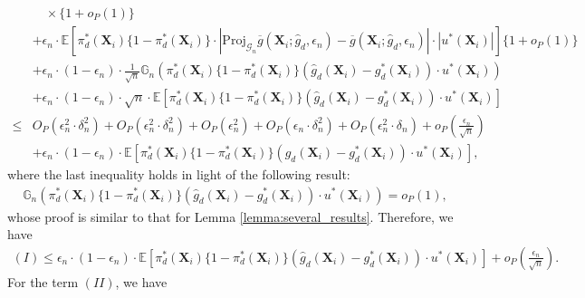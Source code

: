 \documentclass[11pt]{article}
\numberwithin{equation}{section}
\begin{document}
\begin{align*}
	&\quad\times \{1+o_P(1)\} \\
	&+\epsilon_n \cdot \mathbb{E} \left[\pi_d^*(\boldsymbol{X}_i)\{1-\pi_d^*(\boldsymbol{X}_i)\}\cdot|\text{Proj}_{\mathcal{G}_n}\overline{g}(\boldsymbol{X}_{i};\widehat{g}_d,\epsilon_n)-\overline{g}(\boldsymbol{X}_{i};\widehat{g}_d,\epsilon_n)|\cdot |u^*(\boldsymbol{X}_{i})|\right] \{1+o_P(1)\}\\
	&+ \epsilon_n \cdot (1-\epsilon_n)\cdot  \frac{1}{\sqrt{n}}\mathbb{G}_n\left( \pi_d^*(\boldsymbol{X}_i)\{1-\pi_d^*(\boldsymbol{X}_i)\}(\widehat{g}_d(\boldsymbol{X}_{i})-g^*_d(\boldsymbol{X}_{i})) \cdot u^*(\boldsymbol{X}_{i})\right)\\
	&+ \epsilon_n \cdot (1-\epsilon_n)\cdot \sqrt{n}\cdot  \mathbb{E}\left[\pi_d^*(\boldsymbol{X}_i)\{1-\pi_d^*(\boldsymbol{X}_i)\}(\widehat{g}_d(\boldsymbol{X}_{i})-g^*_d(\boldsymbol{X}_{i})) \cdot u^*(\boldsymbol{X}_{i})\right]\\
	\leq& O_P(\epsilon_n^2\cdot \delta_n^2)+O_P(\epsilon_n^2\cdot \delta_n^2)+O_P(\epsilon_n^2)+O_P(\epsilon_n\cdot \delta_n^2)+O_P(\epsilon_n^2\cdot\delta_n)+o_P\left(\frac{\epsilon_n}{\sqrt{n}}\right)\\
	&+\epsilon_n \cdot (1-\epsilon_n)\cdot  \mathbb{E}\left[\pi_d^*(\boldsymbol{X}_i)\{1-\pi_d^*(\boldsymbol{X}_i)\}(\widehat{g}_d(\boldsymbol{X}_{i})-g^*_d(\boldsymbol{X}_{i})) \cdot u^*(\boldsymbol{X}_{i})\right],
\end{align*}
where the last inequality holds in light of the following result:
\begin{align*}
	\mathbb{G}_n\left( \pi_d^*(\boldsymbol{X}_i)\{1-\pi_d^*(\boldsymbol{X}_i)\}(\widehat{g}_d(\boldsymbol{X}_{i})-g^*_d(\boldsymbol{X}_{i})) \cdot u^*(\boldsymbol{X}_{i})\right)=o_P(1),
\end{align*}
whose proof is similar to that for Lemma \ref{lemma:several_results}. Therefore, we have
\begin{align}
	(I)\leq\epsilon_n \cdot (1-\epsilon_n)\cdot   \mathbb{E}\left[\pi_d^*(\boldsymbol{X}_i)\{1-\pi_d^*(\boldsymbol{X}_i)\}(\widehat{g}_d(\boldsymbol{X}_{i})-g^*_d(\boldsymbol{X}_{i})) \cdot u^*(\boldsymbol{X}_{i})\right]+o_P\left(\frac{\epsilon_n}{\sqrt{n}}\right).\label{eq:I_estimate}
\end{align}
For the term $(II)$, we have
\end{document}
